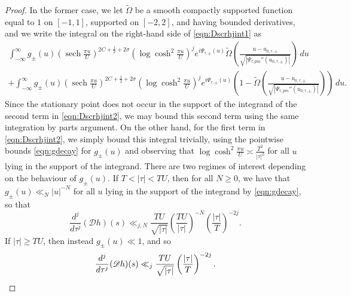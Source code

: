 \documentclass[11pt,a4paper]{amsart}
\newcommand{\Dscr}{\mathscr{D}}
\DeclareMathOperator{\sech}{sech}
\numberwithin{equation}{section}
\theoremstyle{remark}
\theoremstyle{definition}
\begin{document}
\begin{proof}
In the former case, we let $\widetilde{\Omega}$ be a smooth compactly supported function equal to $1$ on $[-1,1]$, supported on $[-2,2]$, and having bounded derivatives, and we write the integral on the right-hand side of \eqref{eqn:Dscrhjint1} as
\begin{multline}
\label{eqn:Dscrhjint2}
\int_{-\infty}^{\infty} g_{\pm}(u) \left(\sech \frac{\pi u}{U}\right)^{2C + \frac{1}{2} + 2\sigma} \left(\log \cosh^2 \frac{\pi u}{U}\right)^j e^{i \Psi_{\tau,\pm}(u)} \widetilde{\Omega}\left(\frac{u - u_{0,\tau,\pm}}{\sqrt{|\Psi_{\tau,pm}''(u_{0,\tau,\pm})|}}\right) \, du	\\
+ \int_{-\infty}^{\infty} g_{\pm}(u) \left(\sech \frac{\pi u}{U}\right)^{2C + \frac{1}{2} + 2\sigma} \left(\log \cosh^2 \frac{\pi u}{U}\right)^j e^{i \Psi_{\tau,\pm}(u)} \left(1 - \widetilde{\Omega}\left(\frac{u - u_{0,\tau,\pm}}{\sqrt{|\Psi_{\tau,pm}''(u_{0,\tau,\pm})|}}\right)\right) \, du.
\end{multline}
Since the stationary point does not occur in the support of the integrand of the second term in \eqref{eqn:Dscrhjint2}, we may bound this second term using the same integration by parts argument. On the other hand, for the first term in \eqref{eqn:Dscrhjint2}, we simply bound this integral trivially, using the pointwise bounds \eqref{eqn:gdecay} for $g_{\pm}(u)$ and observing that $\log \cosh^2 \frac{\pi u}{U} \asymp \frac{T^2}{|\tau|^2}$ for all $u$ lying in the support of the integrand. There are two regimes of interest depending on the behaviour of $g_{\pm}(u)$. If $T < |\tau| < TU$, then for all $N \geq 0$, we have that $g_{\pm}(u) \ll_{N} |u|^{-N}$ for all $u$ lying in the support of the integrand by \eqref{eqn:gdecay}, so that
\[\frac{d^j}{d\tau^j}(\Dscr h)(s) \ll_{j,N} \frac{TU}{\sqrt{|\tau|}} \left(\frac{TU}{|\tau|}\right)^{-N} \left(\frac{|\tau|}{T}\right)^{-2j}.\]
If $|\tau| \geq TU$, then instead $g_{\pm}(u) \ll 1$, and so
\[\frac{d^j}{d\tau^j} (\Dscr h)(s) \ll_j \frac{TU}{\sqrt{|\tau|}} \left(\frac{|\tau|}{T}\right)^{-2j}.\qedhere\]
\end{proof}
\end{document}

